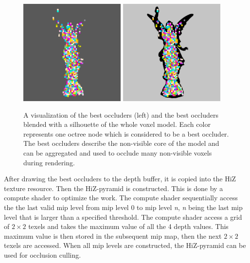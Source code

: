 \begin{figure}[h]
    \centering
    \includegraphics[width=200px]{images/graphics/lucy-best-occluders-viz.png}
    \includegraphics[width=200px]{images/graphics/lucy-best-occluders-diff-viz.png}
    \caption{A visualization of the best occluders (left) and the best occluders blended with a silhouette 
    of the whole voxel model. Each color represents one octree node which is considered to be a best occluder.
    The best occluders describe the non-visible core of the model and can be aggregated and used to occlude 
    many non-visible voxels during rendering.}
    \label{fig:best-occluder-viz}
\end{figure}

\noindent
After drawing the best occluders to the depth buffer, it is copied into the \ac{HiZ} texture resource. Then the 
\ac{HiZ}-pyramid is constructed. This is done by a compute shader to optimize the work. The compute shader 
sequentially access the the last valid mip level from mip level 0 to mip level \emph{n}, \emph{n} being the last 
mip level that is larger than a specified threshold. The compute shader access a grid of \begin{math} 2 \times 2 
\end{math} texels and takes the maximum value of all the 4 depth values. This maximum value is then stored in the 
subsequent mip map, then the next \begin{math} 2 \times 2 \end{math} texels are accessed. When all mip levels are 
constructed, the \ac{HiZ}-pyramid can be used for occlusion culling. \\

